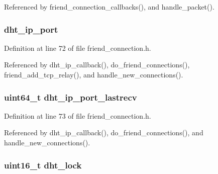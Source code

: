 Referenced by friend\+\_\+connection\+\_\+callbacks(), and handle\+\_\+packet().

\hypertarget{struct_friend___conn_ace58c2ab8adca0a754bcd2527e88a9d2}{
\subsubsection[{dht\+\_\+ip\+\_\+port}]{ dht\+\_\+ip\+\_\+port}}\label{struct_friend___conn_ace58c2ab8adca0a754bcd2527e88a9d2}


Definition at line 72 of file friend\+\_\+connection.\+h.



Referenced by dht\+\_\+ip\+\_\+callback(), do\+\_\+friend\+\_\+connections(), friend\+\_\+add\+\_\+tcp\+\_\+relay(), and handle\+\_\+new\+\_\+connections().

\hypertarget{struct_friend___conn_a1b4abfeab3eeeb285cfc69b1ac8d84bb}{
\subsubsection[{dht\+\_\+ip\+\_\+port\+\_\+lastrecv}]{\setlength{\rightskip}{0pt plus 5cm}uint64\+\_\+t dht\+\_\+ip\+\_\+port\+\_\+lastrecv}}\label{struct_friend___conn_a1b4abfeab3eeeb285cfc69b1ac8d84bb}


Definition at line 73 of file friend\+\_\+connection.\+h.



Referenced by dht\+\_\+ip\+\_\+callback(), do\+\_\+friend\+\_\+connections(), and handle\+\_\+new\+\_\+connections().

\hypertarget{struct_friend___conn_a1da451cf7bce45009c3ae38c003f2ed8}{
\subsubsection[{dht\+\_\+lock}]{\setlength{\rightskip}{0pt plus 5cm}uint16\+\_\+t dht\+\_\+lock}}\label{struct_friend___conn_a1da451cf7bce45009c3ae38c003f2ed8}


